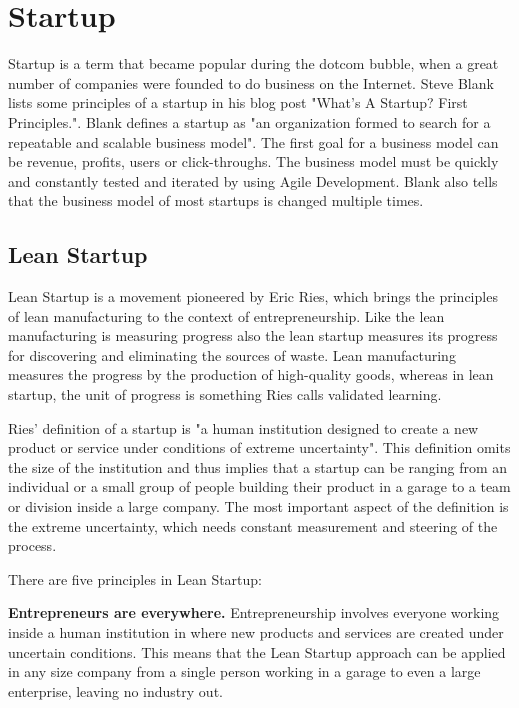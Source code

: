 
 \section{Startup}

Startup is a term that became popular during the dotcom bubble, when a great number of companies were founded to do business on the Internet. Steve Blank lists some principles of a startup in his blog post "What’s A Startup? First Principles.". Blank defines a startup as "an organization formed to search for a repeatable and scalable business model". The first goal for a business model can be revenue, profits, users or click-throughs. The business model must be quickly and constantly tested and iterated by using Agile Development. Blank also tells that the business model of most startups is changed multiple times.~\cite{blank2010startup}

 \subsection{Lean Startup}
 
Lean Startup is a movement pioneered by Eric Ries, which brings the principles of lean manufacturing to the context of entrepreneurship. Like the lean manufacturing is measuring progress also the lean startup measures its progress for discovering and eliminating the sources of waste. Lean manufacturing measures the progress by the production of high-quality goods, whereas in lean startup, the unit of progress is something Ries calls validated learning.

Ries' definition of a startup is "a human institution designed to create a new product or service under conditions of extreme uncertainty". This definition omits the size of the institution and thus implies that a startup can be ranging from an individual or a small group of people building their product in a garage to a team or division inside a large company. The most important aspect of the definition is the extreme uncertainty, which needs constant measurement and steering of the process.

There are five principles in Lean Startup:


\textbf{Entrepreneurs are everywhere.} Entrepreneurship involves everyone working inside a human institution in where new products and services are created under uncertain conditions. This means that the Lean Startup approach can be applied in any size company from a single person working in a garage to even a large enterprise, leaving no industry out.

